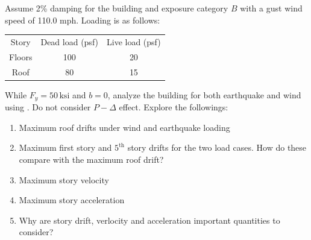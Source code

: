 \documentclass{simcenterdocumentation}
\newcommand{\ksi}{\ensuremath{\,\mathrm{ksi}}}
\begin{document}
Assume 2\% damping for the building and exposure category $B$ with a gust wind speed of 110.0 mph. Loading is as follows:
\begin{table}[H]
\centering
\begin{tabular}{ccc}
Story			& Dead load	(psf)		& Live load	(psf)	\\ \cmidrule(rl){1-1}\cmidrule(rl){2-2}\cmidrule(rl){3-3}
Floors			& 100				& 20			\\
Roof			& 80				& 15			
\end{tabular}
\end{table}
While $F_y = 50 \ksi$ and $b = 0$, analyze the building for both earthquake and wind using . Do not consider $P-\Delta$ effect. Explore the followings:

\begin{enumerate}[label=\alph*)]
	\item Maximum roof drifts under wind and earthquake loading
	\item Maximum first story and $5^\mathrm{th}$ story drifts for the two load cases. How do these compare with the maximum roof drift?
	\item Maximum story velocity
	\item Maximum story acceleration
	\item Why are story drift, verlocity and acceleration important quantities to consider?
\end{enumerate}
\end{document}
